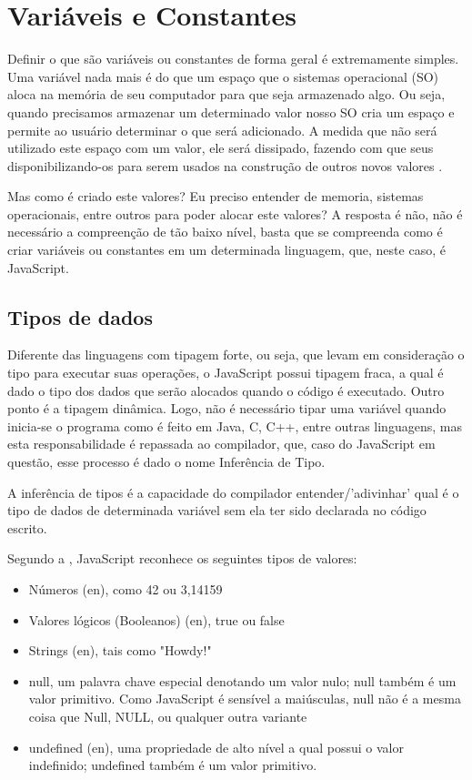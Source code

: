 \chapter{Variáveis e Constantes}

Definir o que são variáveis ou constantes de forma geral é extremamente simples. Uma variável nada mais é do que um espaço que o sistemas operacional (SO) aloca na memória de seu computador para que seja armazenado algo. Ou seja, quando precisamos armazenar um determinado valor nosso SO cria um espaço e permite ao usuário determinar o que será adicionado. A medida que não será utilizado este espaço com um valor, ele será dissipado, fazendo com que seus disponibilizando-os para serem usados na construção de outros novos valores \cite{haverbeke2014eloquent}.

Mas como é criado este valores? Eu preciso entender de memoria, sistemas operacionais, entre outros para poder alocar este valores? A resposta é não, não é necessário a compreenção de tão baixo nível, basta que se compreenda como é criar variáveis ou constantes em um determinada linguagem, que, neste caso, é JavaScript.

\section{Tipos de dados}

Diferente das linguagens com tipagem forte, ou seja, que levam em consideração o tipo para executar suas operações, o JavaScript possui tipagem fraca, a qual é dado o tipo dos dados que serão alocados quando o código é executado. Outro ponto é a tipagem dinâmica. Logo, não é necessário tipar uma variável quando inicia-se o programa como é feito em Java, C, C++, entre outras linguagens, mas esta responsabilidade é repassada ao compilador, que, caso do JavaScript em questão, esse processo é dado o nome Inferência de Tipo.

A inferência de tipos é a capacidade do compilador entender/’adivinhar’ qual é o tipo de dados de determinada variável sem ela ter sido declarada no código escrito. 

Segundo a , JavaScript reconhece os seguintes tipos de valores:

\begin{itemize}
  \item Números (en), como 42 ou 3,14159
  \item Valores lógicos (Booleanos) (en), true ou false
  \item Strings (en), tais como "Howdy!"
  \item null, um palavra chave especial denotando um valor nulo; null também é um valor primitivo. Como JavaScript é sensível a maiúsculas, null não é a mesma coisa que Null, NULL, ou qualquer outra variante
  \item undefined (en), uma propriedade de alto nível a qual possui o valor indefinido; undefined também é um valor primitivo.  
\end{itemize}

